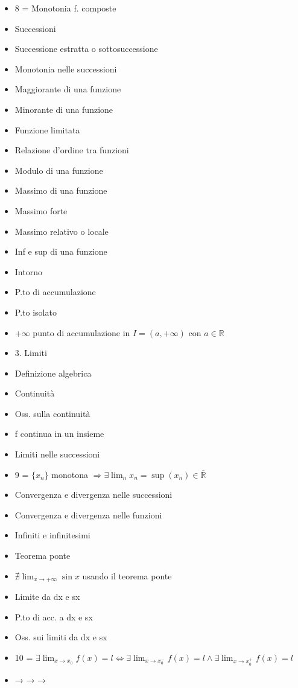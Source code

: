 \begin{itemize}
\item 8 = Monotonia f. composte
\item Successioni
\item Successione estratta o sottosuccessione
\item Monotonia nelle successioni
\item Maggiorante di una funzione
\item Minorante di una funzione
\item Funzione limitata
\item Relazione d’ordine tra funzioni
\item Modulo di una funzione
\item Massimo di una funzione
\item Massimo forte
\item Massimo relativo o locale
\item Inf e sup di una funzione
\item Intorno
\item P.to di accumulazione
\item P.to isolato
\item $+\infty$ punto di accumulazione in $I=(a,+\infty)$ con $a\in\mathbb R$
\item 3. Limiti
\item Definizione algebrica
\item Continuità
\item Oss. sulla continuità
\item f continua in un insieme
\item Limiti nelle successioni
\item 9 = $\{x_n\}$ monotona $\Rightarrow\exists\lim_n x_n=\sup(x_n)\in\overline{\mathbb R}$
\item Convergenza e divergenza nelle successioni
\item Convergenza e divergenza nelle funzioni
\item Infiniti e infinitesimi
\item Teorema ponte
\item $\nexists\lim_{x\to+\infty}\sin x$ usando il teorema ponte
\item Limite da dx e sx
\item P.to di acc. a dx e sx
\item Oss. sui limiti da dx e sx
\item 10 = $\exists\lim_{x\to x_0}f(x)=l\iff\exists\lim_{x\to x_0^-}f(x)=l\land\exists\lim_{x\to x_0^+}f(x)=l$
\item →             →                 →

\end{itemize}

